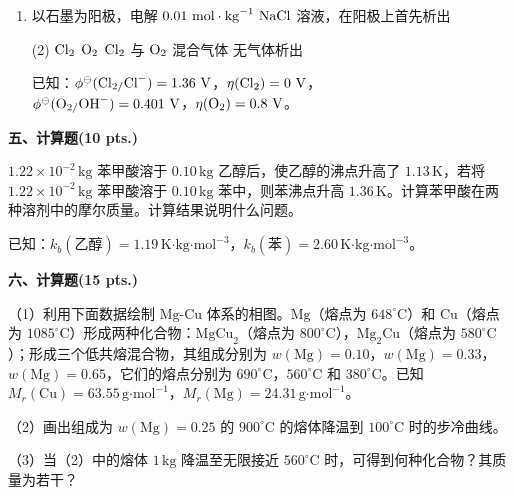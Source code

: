 \begin{enumerate}[label=\arabic*., start=1, itemsep=1.5ex]
    但这些公式只适于绝热可逆过程的是
    \begin{tasks}(4)
        \task (1), (2)
        \task (3), (4)
        \task (5), (6)
        \task (4), (5)
    \end{tasks}

    \item 以石墨为阳极，电解 $0.01\ \text{mol}\cdot\text{kg}^{-1}\ \ce{NaCl}$ 溶液，在阳极上首先析出
    \begin{tasks}(2)
        \task $\ce{Cl2}$
        \task $\ce{O2}$
        \task $\ce{Cl2}$ 与 $\ce{O2}$ 混合气体
        \task 无气体析出
    \end{tasks}
    已知：$\phi^\ominus(\ce{Cl2/Cl-}) = 1.36\ \text{V}$，$\eta(\ce{Cl2}) = 0\ \text{V}$，\\
    \hspace*{3em}$\phi^\ominus(\ce{O2/OH-}) = 0.401\ \text{V}$，$\eta(\ce{O2}) = 0.8\ \text{V}$。
\end{enumerate}

\vspace{0.5cm}
\noindent\textbf{五、计算题(10 pts.)}

$1.22\times 10^{-2}\,\text{kg}$ 苯甲酸溶于 $0.10\,\text{kg}$ 乙醇后，使乙醇的沸点升高了 $1.13\,\text{K}$，若将 $1.22\times 10^{-2}\,\text{kg}$ 苯甲酸溶于 $0.10\,\text{kg}$ 苯中，则苯沸点升高 $1.36\,\text{K}$。计算苯甲酸在两种溶剂中的摩尔质量。计算结果说明什么问题。

已知：$k_b(\text{乙醇})=1.19\,\text{K·kg·mol}^{-3}$，$k_b(\text{苯})=2.60\,\text{K·kg·mol}^{-3}$。

\vspace{0.5cm}
\noindent\textbf{六、计算题(15 pts.)}

（1）利用下面数据绘制 $\text{Mg-Cu}$ 体系的相图。$\text{Mg}$（熔点为 $648^\circ\text{C}$）和 $\text{Cu}$（熔点为 $1085^\circ\text{C}$）形成两种化合物：$\text{MgCu}_2$（熔点为 $800^\circ\text{C}$），$\text{Mg}_2\text{Cu}$（熔点为 $580^\circ\text{C}$）；形成三个低共熔混合物，其组成分别为 $w(\text{Mg})=0.10$，$w(\text{Mg})=0.33$，$w(\text{Mg})=0.65$，它们的熔点分别为 $690^\circ\text{C}$，$560^\circ\text{C}$ 和 $380^\circ\text{C}$。已知 $M_r(\text{Cu})=63.55\,\text{g·mol}^{-1}$，$M_r(\text{Mg})=24.31\,\text{g·mol}^{-1}$。

（2）画出组成为 $w(\text{Mg})=0.25$ 的 $900^\circ\text{C}$ 的熔体降温到 $100^\circ\text{C}$ 时的步冷曲线。

（3）当（2）中的熔体 $1\,\text{kg}$ 降温至无限接近 $560^\circ\text{C}$ 时，可得到何种化合物？其质量为若干？

